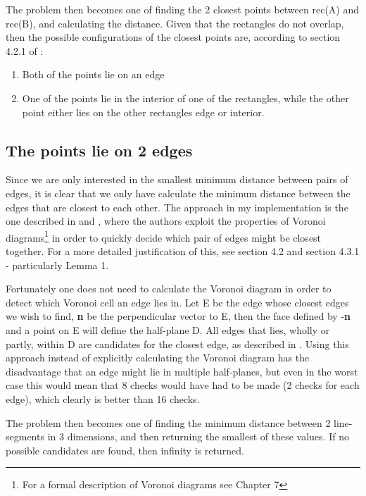 The problem then becomes one of finding the 2 closest points between rec(A) and rec(B), and calculating the distance.
Given that the rectangles do not overlap, then the possible configurations of the closest points are, according to section 4.2.1 of \cite{Larsen99fastproximity}:
\begin{enumerate}
\item Both of the points lie on an edge
\item One of the points lie in the interior of one of the rectangles, while the other point either lies on the other rectangles edge or interior.
\end{enumerate}

\subsection{The points lie on 2 edges}
\label{minimumDistance}
Since we are only interested in the smallest minimum distance between pairs of edges, it is clear that we only have calculate the minimum distance between the edges that are closest to each other. The approach in my implementation is the one described in \cite{larsen00fast} and \cite{Larsen99fastproximity}, where the authors exploit the properties of Voronoi diagrams\footnote{For a formal description of Voronoi diagrams see \cite{compgeom:2008} Chapter 7} in order to quickly decide which pair of edges might be closest together. For a more detailed justification of this, see \cite{larsen00fast} section 4.2 and \cite{Larsen99fastproximity} section 4.3.1 - particularly Lemma 1.

Fortunately one does not need to calculate the Voronoi diagram in order to detect which Voronoi cell an edge lies in. Let E be the edge whose closest edges we wish to find, \textbf{n} be the perpendicular vector to E, then the face defined by -\textbf{n} and a point on E will define the half-plane D. All edges that lies, wholly or partly, within D are candidates for the closest edge, as described in \cite{larsen00fast}. Using this approach instead of explicitly calculating the Voronoi diagram has the disadvantage that an edge might lie in multiple half-planes, but even in the worst case this would mean that 8 checks would have had to be made (2 checks for each edge), which clearly is better than 16 checks.

The problem then becomes one of finding the minimum distance between 2 line-segments in 3 dimensions, and then returning the smallest of these values. If no possible candidates are found, then infinity is returned.

